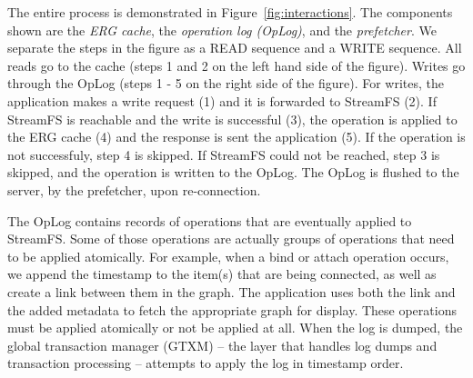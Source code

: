 The entire process is demonstrated in Figure~\ref{fig:interactions}.  The components shown are the \emph{ERG cache}, the \emph{operation
log (OpLog)}, and the \emph{prefetcher}.  We separate the steps in the figure as a READ sequence and a WRITE sequence.
All reads go to the cache (steps 1 and 2 on the left hand side of the figure).  Writes go through the OpLog (steps 1 - 5 on the right
side of the figure).  For writes, 
the application makes a write request (1) and it is forwarded to StreamFS (2).  If StreamFS is reachable and the write is
successful (3), the operation is applied to the ERG cache (4) and the response is sent the application (5).
If the operation is not successfuly, step 4 is skipped.  If StreamFS could not be reached, step 3 is skipped, and the operation
is written to the OpLog.  The OpLog is flushed to the server, by the prefetcher, upon re-connection.  

The OpLog contains records of operations that are eventually applied to StreamFS.  Some of those operations
are actually groups of operations that need to be applied atomically.  For example, 
when a bind or attach operation occurs, we append the timestamp to the item(s) that are being connected, as well as create
a link between them in the graph.  The application uses both the link and the added metadata to fetch the appropriate
graph for display.  These operations must be applied atomically or not be applied at all.
When the log is dumped, the global transaction manager (GTXM) -- the layer that handles log dumps and transaction processing --
attempts to apply the log in timestamp order.





